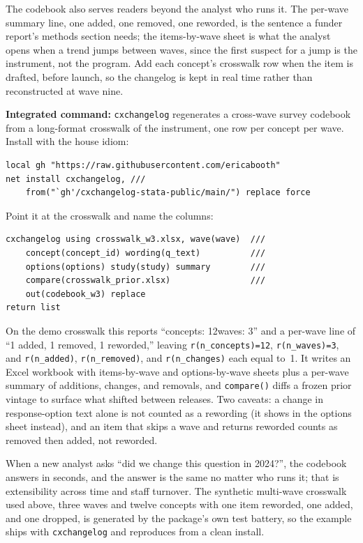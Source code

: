 The codebook also serves readers beyond the analyst who runs it. The per-wave summary line, one added, one removed, one reworded, is the sentence a funder report's methods section needs; the items-by-wave sheet is what the analyst opens when a trend jumps between waves, since the first suspect for a jump is the instrument, not the program. Add each concept's crosswalk row when the item is drafted, before launch, so the changelog is kept in real time rather than reconstructed at wave nine.

\begin{kaobox}[frametitle=Package Integration: \texttt{cxchangelog}]
\textbf{Integrated command:} \texttt{cxchangelog} regenerates a cross-wave survey codebook from a long-format crosswalk of the instrument, one row per concept per wave. Install with the house idiom:
\par
{\footnotesize
\begin{verbatim}
local gh "https://raw.githubusercontent.com/ericabooth"
net install cxchangelog, ///
    from("`gh'/cxchangelog-stata-public/main/") replace force
\end{verbatim}
}
Point it at the crosswalk and name the columns:
\par
{\footnotesize
\begin{verbatim}
cxchangelog using crosswalk_w3.xlsx, wave(wave)  ///
    concept(concept_id) wording(q_text)          ///
    options(options) study(study) summary        ///
    compare(crosswalk_prior.xlsx)                ///
    out(codebook_w3) replace
return list
\end{verbatim}
}
On the demo crosswalk this reports \enquote{concepts: 12\quad waves: 3} and a per-wave line of \enquote{1 added, 1 removed, 1 reworded,} leaving \texttt{r(n\_concepts)=12}, \texttt{r(n\_waves)=3}, and \texttt{r(n\_added)}, \texttt{r(n\_removed)}, and \texttt{r(n\_changes)} each equal to~1. It writes an Excel workbook with items-by-wave and options-by-wave sheets plus a per-wave summary of additions, changes, and removals, and \texttt{compare()} diffs a frozen prior vintage to surface what shifted between releases. Two caveats: a change in response-option text alone is not counted as a rewording (it shows in the options sheet instead), and an item that skips a wave and returns reworded counts as removed then added, not reworded.
\end{kaobox}

When a new analyst asks \enquote{did we change this question in 2024?}, the codebook answers in seconds, and the answer is the same no matter who runs it; that is extensibility across time and staff turnover. The synthetic multi-wave crosswalk used above, three waves and twelve concepts with one item reworded, one added, and one dropped, is generated by the package's own test battery, so the example ships with \texttt{cxchangelog} and reproduces from a clean install.

